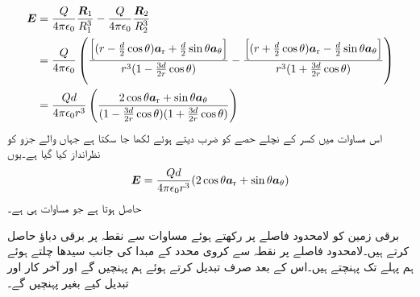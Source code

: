 \begin{align*}
{\ensuremath{{\boldsymbol{E}}}}&=\frac{Q}{4\pi\epsilon_0} \frac{{{\boldsymbol{R}}}_1}{R_1^3}-\frac{Q}{4\pi\epsilon_0} \frac{{{\boldsymbol{R}}}_2}{R_2^3}\\
&=\frac{Q}{4\pi\epsilon_0}\left(\frac{\left[(r-\frac{d}{2}\cos\theta){\boldsymbol{a}}_{\textup{r}}+\frac{d}{2}\sin\theta {\boldsymbol{a}}_{\theta}\right]}{r^3 (1-\frac{3d}{2r} \cos \theta)}-\frac{\left[(r+\frac{d}{2}\cos \theta ){\boldsymbol{a}}_{\textup{r}}-\frac{d}{2}\sin \theta {\boldsymbol{a}}_{\theta}\right]}{r^3 (1+\frac{3d}{2r} \cos \theta)} \right)\\
&=\frac{Qd }{4\pi\epsilon_0 r^3}\left( \frac{2 \cos \theta {\boldsymbol{a}}_{\textup{r}}+\sin \theta {\boldsymbol{a}}_{\theta}}{(1-\frac{3d}{2r} \cos \theta)(1+\frac{3d}{2r} \cos \theta)}\right)
\end{align*}
اس مساوات میں کسر کے نچلے حصے کو ضرب دیتے ہوئے  لکھا جا سکتا ہے جہاں  والے جزو کو نظرانداز کیا گیا ہے۔یوں
\begin{align}\label{مساوات_توانائی_جفت_قطب_دور_میدان_ب}
{\ensuremath{{\boldsymbol{E}}}}=\frac{Qd }{4\pi\epsilon_0 r^3}( 2 \cos \theta {\boldsymbol{a}}_{\textup{r}}+\sin \theta {\boldsymbol{a}}_{\theta})
\end{align}
حاصل ہوتا ہے جو مساوات  ہی ہے۔

برقی زمین کو لامحدود فاصلے پر رکھتے ہوئے  مساوات  سے نقطہ  پر برقی دباؤ حاصل کرتے ہیں۔لامحدود فاصلے پر نقطہ   سے کروی محدد کے مبدا کی جانب سیدھا چلتے ہوئے ہم پہلے  تک پہنچتے ہیں۔اس کے بعد صرف  تبدیل کرتے ہوئے ہم  پہنچیں گے اور آخر کار  اور  تبدیل کیے بغیر  پہنچیں گے۔  

